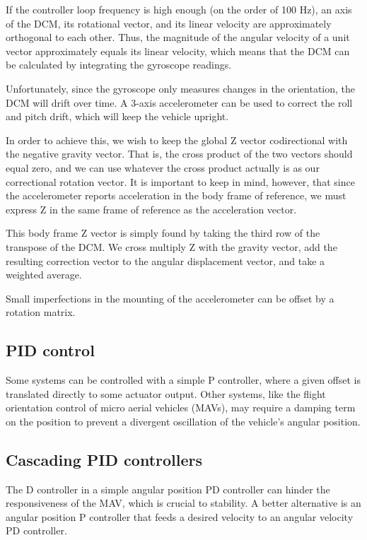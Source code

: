\documentclass[12pt,letterpaper]{article}
\begin{document}
If the controller loop frequency is high enough (on the order of 100 Hz), an
axis of the DCM, its rotational vector, and its linear velocity are
approximately orthogonal to each other. Thus, the magnitude of the angular
velocity of a unit vector approximately equals its linear velocity, which means
that the DCM can be calculated by integrating the gyroscope readings.

Unfortunately, since the gyroscope only measures changes in the orientation,
the DCM will drift over time. A 3-axis accelerometer can be used to correct the
roll and pitch drift, which will keep the vehicle upright.

In order to achieve this, we wish to keep the global Z vector codirectional
with the negative gravity vector. That is, the cross product of the two vectors
should equal zero, and we can use whatever the cross product actually is as our
correctional rotation vector. It is important to keep in mind, however, that
since the accelerometer reports acceleration in the body frame of reference, we
must express Z in the same frame of reference as the acceleration vector.

This body frame Z vector is simply found by taking the third row of the
transpose of the DCM. We cross multiply Z with the gravity vector, add the
resulting correction vector to the angular displacement vector, and take a
weighted average.

Small imperfections in the mounting of the accelerometer can be offset by a
rotation matrix.


\subsection*{PID control}

Some systems can be controlled with a simple P controller, where a given offset
is translated directly to some actuator output. Other systems, like the flight
orientation control of micro aerial vehicles (MAVs), may require a damping term
on the position to prevent a divergent oscillation of the vehicle's angular
position.


\subsection*{Cascading PID controllers}

The D controller in a simple angular position PD controller can hinder the
responsiveness of the MAV, which is crucial to stability. A better alternative
is an angular position P controller that feeds a desired velocity to an angular
velocity PD controller.
\end{document}
